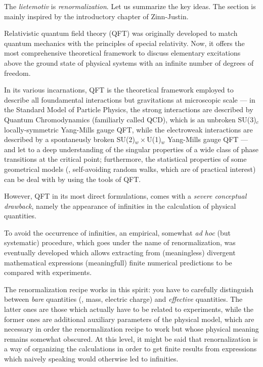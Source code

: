 



The \emph{lietemotiv} is \emph{renormalization}. Let us summarize the key
ideas. The section is mainly inspired by the introductory chapter of
Zinn-Justin.

Relativistic quantum field theory (QFT) was originally developed to match
quantum mechanics with the principles of special relativity. 
Now, it offers the most comprehensive theoretical framework to discuss
elementary excitations above the ground state of physical systems with an
infinite number of degrees of freedom.

In its various incarnations, QFT is the theoretical framework employed to
describe all foundamental interactions but
gravitations at microscopic scale --- in the Standard Model of Particle Physics,
the strong interactions  are described by  Quantum Chromodynamics (familiarly
called QCD), which is 
an unbroken SU(3)$_{c}$ locally-symmetric Yang-Mills gauge QFT, while the electroweak
interactions are described by  a spontaneusly broken SU(2)$_{w}
\times$U(1)$_{w}$ Yang-Mills gauge QFT ---  and
let to a deep understanding of the singular properties of a wide class of phase
transitions at the critical point; furthermore, the statistical properties of
some geometrical models (\eg, self-avoiding random walks, which are of
practical interest) can be deal with by using the tools of QFT.

However, QFT in its most direct formulations, comes  with a \emph{severe conceptual
   drawback}, namely the appearance of infinities in the
calculation  of physical quantities. 

To avoid the occurrence of infinities, an empirical, somewhat \emph{ad hoc} (but
systematic) procedure,
which goes under the name of renormalization, was eventually developed which allows extracting from
(meaningless) divergent mathematical expressions
(meaningfull) finite numerical predictions to be compared with experiments.

The renormalization recipe works in this spirit: you have to carefully
distinguish between \emph{bare} quantities (\eg, mass, electric charge) and
\emph{effective}
quantities. The latter ones are those which actually have to be related to
experiments, while the former ones are additional auxiliary parameters of the
physical model, which are necessary in order the renormalization recipe to work
but whose physical meaning remains somewhat obscured.
At this level, it might be said that renornalization is a way of organizing the
calculations in order to get finite results from expressions which naively
speaking would otherwise led to infinities.

